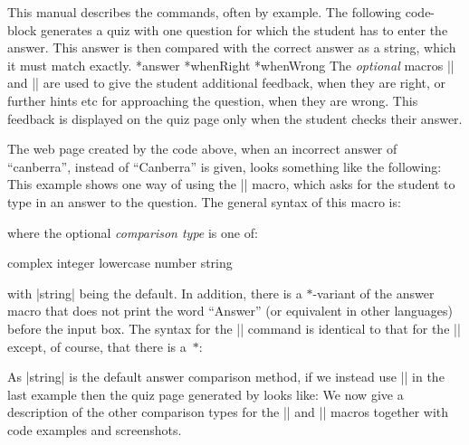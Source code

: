 \documentclass[svgnames]{article}
\makeatletter
\newcommand\macroIndex[1]{%
  \lowercase{\def\temp{#1}}%
  \expandafter\index\expandafter{\temp@\textbackslash#1}%
}
\makeatother
\begin{document}
  This manual describes the \WebQuiz commands, often by example. The
  following code-block generates a quiz with one question for which the
  student has to enter the answer. This answer is then compared with the
  correct answer as a string, which it must match exactly.
    \macroIndex{answer}*{answer}
    *{whenRight}
    *{whenWrong}
    The \textit{optional} macros \LatexCode|\whenRight| and
    \LatexCode|\whenWrong| are used to give the student additional
    feedback, when they are right, or further hints etc for approaching
    the question, when they are wrong. This feedback is displayed on the
    quiz page only when the student checks their answer.

    The web page created by the code above, when an incorrect answer of
    ``canberra'', instead of ``Canberra'' is given, looks something like
    the following:
    This example shows one way of using the \LatexCode|\answer| macro, which
    asks for the student to type in an answer to the question. The general syntax of
    this macro is:
    \begin{latexcode}
    \end{latexcode}
    where the optional \textit{comparison type} is one of:
    \begin{latexcode}
        complex    integer    lowercase    number    string
    \end{latexcode}
    with \LatexCode|string| being the default.  In addition, there is a
    $*$-variant of the answer macro that does not print the word
    ``Answer'' (or equivalent in other languages) before the input box.
    The syntax for the \LatexCode|\answer*| command is identical to that
    for the \LatexCode|\answer| except, of course, that there is a~$*$:
    \begin{latexcode}
    \end{latexcode}
    As \LatexCode|string| is the default answer comparison method, if we
    instead use \LatexCode|| in the last example then
    the quiz page generated by \WebQuiz looks like:
    We now give a description of the other comparison types for the
    \LatexCode|\answer| and \LatexCode|\answer*| macros together with
    code examples and screenshots.
\end{document}
